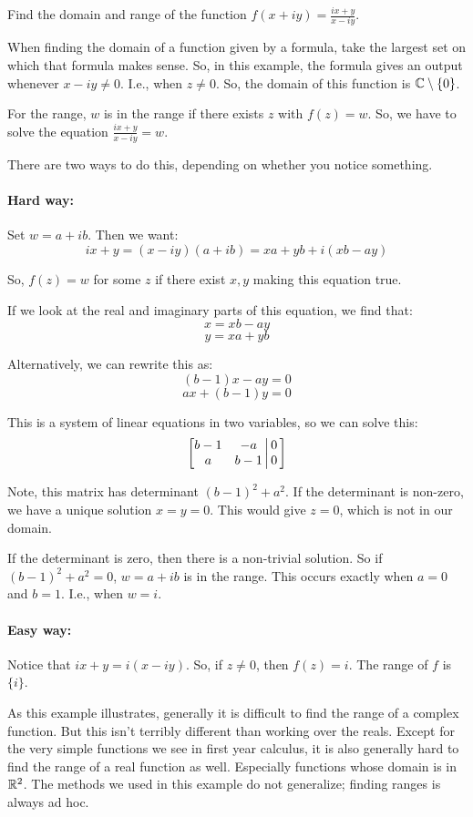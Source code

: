 \begin{ex}{}{} Find the domain and range of the function $f(x + iy) = \frac{ix + y}{x - iy}$.

When finding the domain of a function given by a formula, take the largest set on which that formula makes sense. So, in this example, the formula gives an output whenever $x - iy\ne 0$. I.e., when $z\ne 0$. So, the domain of this function is $\mathbb{C}\setminus\{0\}$.

For the range, $w$ is in the range if there exists $z$ with $f(z) = w$. So, we have to solve the equation $\frac{ix + y}{x-iy} = w$.

There are two ways to do this, depending on whether you notice something.

\paragraph{Hard way:} Set $w = a+ib$. Then we want:
$$ix + y = (x-iy)(a+ib) = xa + yb + i(xb - ay)$$

So, $f(z) = w$ for some $z$ if there exist $x,y$ making this equation true.

If we look at the real and imaginary parts of this equation, we find that:
$$x = xb - ay$$
$$y = xa + yb$$

Alternatively, we can rewrite this as:
$$(b-1)x -ay = 0$$
$$ax +(b-1)y = 0$$

This is a system of linear equations in two variables, so we can solve this:
$$\left[ \begin{matrix}b-1&-a\\a&b-1\end{matrix} \,\middle\vert\, \begin{matrix}0\\0 \end{matrix} \, \right]$$

Note, this matrix has determinant $(b-1)^2  + a^2$. If the determinant is non-zero, we have a unique solution $x = y = 0$. This would give $z = 0$, which is not in our domain. 

If the determinant is zero, then there is a non-trivial solution. So if $(b-1)^2 +a^2 = 0$, $w = a+ib$ is in the range. This occurs exactly when $a = 0$ and $b = 1$. I.e., when $w = i$.

\paragraph{Easy way:} Notice that $ix + y = i(x - iy)$. So, if $z\ne 0$, then $f(z) = i$. The range of $f$ is $\{i\}$.

\end{ex}

As this example illustrates, generally it is difficult to find the range of a complex function. But this isn't terribly different than working over the reals. Except for the very simple functions we see in first year calculus, it is also generally hard to find the range of a real function as well. Especially functions whose domain is in $\mathbb{R}^2$. The methods we used in this example do not generalize; finding ranges is always ad hoc.

